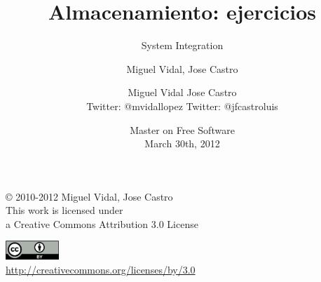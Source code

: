 \documentclass{beamer}
\begin{document}
\title{Almacenamiento: ejercicios}
\subtitle{System Integration}
\author{Miguel Vidal, Jose Castro} 
\date{\footnotesize{Master on Free Software \\ March 30th, 2012}}
\author{Miguel Vidal \hspace{1cm} Jose Castro \\
\hspace{0.5mm} {\tiny Twitter: @mvidallopez \hspace{1.1cm}Twitter: @jfcastroluis}
}



\begin{frame}
  \vspace{2cm}
  \begin{flushright}
    {\small \copyright{} 2010-2012 Miguel Vidal, Jose Castro} \\
    \medskip
    {\scriptsize This work is licensed under \\ a Creative Commons Attribution 3.0 License}
  \end{flushright}
  \begin{flushright}
    \href{http://creativecommons.org/licenses/by/3.0/es}{\includegraphics[width=2cm]{format/cc-by.png}} \\
    {\tiny \url{http://creativecommons.org/licenses/by/3.0}}
  \end{flushright}
\end{frame}%

\usebackgroundtemplate{}

\end{document}
